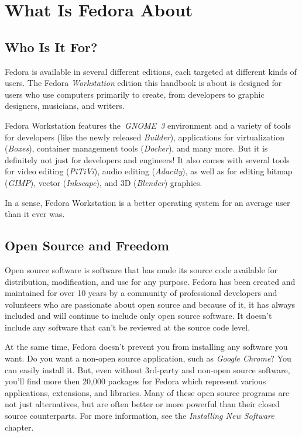 \section*{What Is Fedora About}
\subsection*{Who Is It For?}

Fedora is available in several different editions, each targeted at different kinds of users. The Fedora \emph{Workstation} edition this handbook is about is designed for users who use computers primarily to create, from developers to graphic designers, musicians, and writers.

Fedora Workstation features the~\emph{GNOME~3} environment and a variety of tools for developers (like the newly released \emph{Builder}), applications for virtualization (\emph{Boxes}), container management tools (\emph{Docker}), and many more. But it is definitely not just for developers and engineers! It also comes with several tools for video editing (\emph{PiTiVi}), audio editing (\emph{Adacity}), as well as for editing bitmap (\emph{GIMP}), vector (\emph{Inkscape}), and 3D (\emph{Blender}) graphics.

In a sense, Fedora Workstation is a better operating system for an average user than it ever was.

\subsection*{Open Source and Freedom}

Open source software is software that has made its source code available for distribution, modification, and use for any purpose. Fedora has been created and maintained for over 10 years by a community of professional developers and volunteers who are passionate about open source and because of it, it has always included and will continue to include only open source software. It doesn't include any software that can't be reviewed at the source code level.

At the same time, Fedora doesn't prevent you from installing any software you want. Do you want a non-open source application, such as \emph{Google Chrome}? You can easily install it. But, even without 3rd-party and non-open source software, you'll find more then 20,000 packages for Fedora which represent various applications, extensions, and libraries. Many of these open source programs are not just alternatives, but are often better or more powerful than their closed source counterparts. For more information, see the \emph{Installing New Software} chapter.

